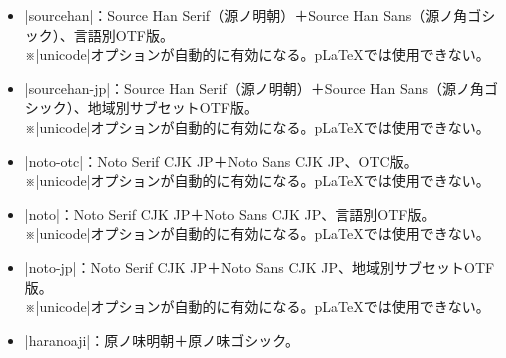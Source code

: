 \documentclass[dvipdfmx]{jlreq}
\newcommand{\pLaTeX}{p\LaTeX}
\begin{document}
\begin{itemize}
  ※|unicode|オプションが自動的に有効になる。{\pLaTeX}では使用できない。
\item |sourcehan|：Source Han Serif（源ノ明朝）＋Source Han Sans（源ノ角ゴシック）、言語別OTF版。\\
  ※|unicode|オプションが自動的に有効になる。{\pLaTeX}では使用できない。
\item |sourcehan-jp|：Source Han Serif（源ノ明朝）＋Source Han Sans（源ノ角ゴシック）、地域別サブセットOTF版。\\
  ※|unicode|オプションが自動的に有効になる。{\pLaTeX}では使用できない。
\item |noto-otc|：Noto Serif CJK JP＋Noto Sans CJK JP、OTC版。\\
  ※|unicode|オプションが自動的に有効になる。{\pLaTeX}では使用できない。
\item |noto|：Noto Serif CJK JP＋Noto Sans CJK JP、言語別OTF版。\\
  ※|unicode|オプションが自動的に有効になる。{\pLaTeX}では使用できない。
\item |noto-jp|：Noto Serif CJK JP＋Noto Sans CJK JP、地域別サブセットOTF版。\\
  ※|unicode|オプションが自動的に有効になる。{\pLaTeX}では使用できない。
\item |haranoaji|：原ノ味明朝＋原ノ味ゴシック。
\end{itemize}
\end{document}
